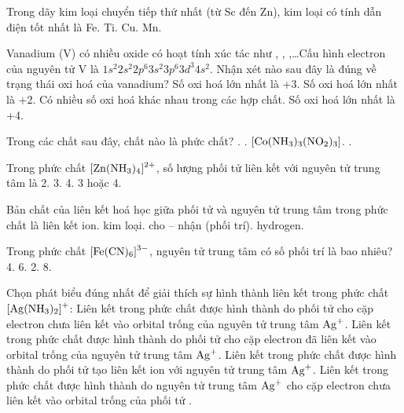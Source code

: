 \documentclass[11pt,a4paper]{article}
\def\loigiai#1{}
\begin{document}
\begin{ex}
Trong dãy kim loại chuyển tiếp thứ nhất (từ Sc đến Zn), kim loại có tính dẫn điện tốt nhất là
\choice
{Fe.}
{Ti.}
{Cu.}
{Mn.}
\loigiai{}
\end{ex}

\begin{ex}
Vanadium (V) có nhiều oxide có hoạt tính xúc tác như , , ,\dots Cấu hình electron của nguyên tử V là $1s^2 2s^2 2p^6 3s^2 3p^6 3d^3 4s^2$. Nhận xét nào sau đây là đúng về trạng thái oxi hoá của vanadium?
\choice
{Số oxi hoá lớn nhất là +3.}
{Số oxi hoá lớn nhất là +2.}
{Có nhiều số oxi hoá khác nhau trong các hợp chất.}
{Số oxi hoá lớn nhất là +4.}
\loigiai{}
\end{ex}

\begin{ex}
Trong các chất sau đây, chất nào là phức chất?
\choice
{.}
{.}
{$\ce{[Co(NH3)3(NO2)3]}$.}
{.}
\loigiai{}
\end{ex}

\begin{ex}
Trong phức chất $\ce{[Zn(NH3)4]^2+}$, số lượng phối tử liên kết với nguyên tử trung tâm là
\choice
{2.}
{3.}
{4.}
{3 hoặc 4.}
\loigiai{}
\end{ex}

\begin{ex}
Bản chất của liên kết hoá học giữa phối tử và nguyên tử trung tâm trong phức chất là liên kết
\choice
{ion.}
{kim loại.}
{cho -- nhận (phối trí).}
{hydrogen.}
\loigiai{}
\end{ex}

\begin{ex}
Trong phức chất $\ce{[Fe(CN)6]^3-}$, nguyên tử trung tâm có số phối trí là bao nhiêu?
\choice
{4.}
{6.}
{2.}
{8.}
\loigiai{}
\end{ex}

\begin{ex}
Chọn phát biểu đúng nhất để giải thích sự hình thành liên kết trong phức chất $\ce{[Ag(NH3)2]+}$:
\choice
{Liên kết trong phức chất được hình thành do phối tử  cho cặp electron chưa liên kết vào orbital trống của nguyên tử trung tâm $\ce{Ag+}$.}
{Liên kết trong phức chất được hình thành do phối tử  cho cặp electron đã liên kết vào orbital trống của nguyên tử trung tâm $\ce{Ag+}$.}
{Liên kết trong phức chất được hình thành do phối tử  tạo liên kết ion với nguyên tử trung tâm $\ce{Ag+}$.}
{Liên kết trong phức chất được hình thành do nguyên tử trung tâm $\ce{Ag+}$ cho cặp electron chưa liên kết vào orbital trống của phối tử .}
\loigiai{}
\end{ex}
\end{document}
